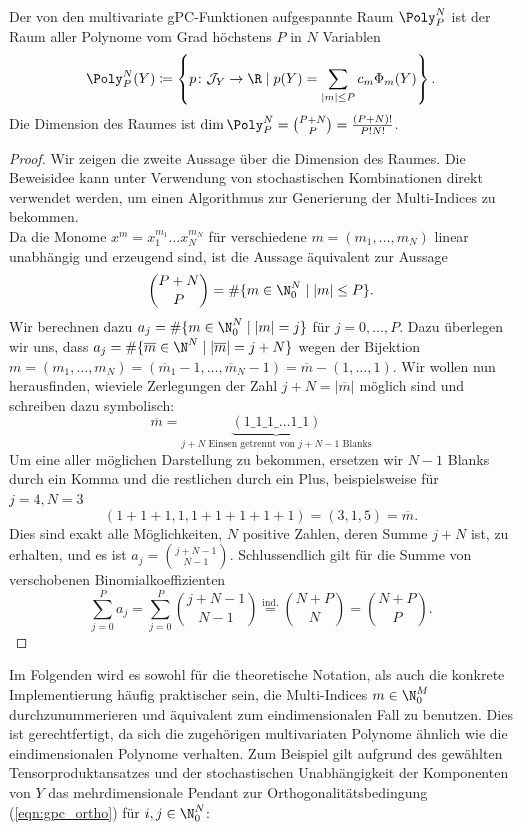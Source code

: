 \begin{mathbem}
Der von den multivariate gPC-Funktionen aufgespannte Raum $\Poly_P^N$ ist der Raum aller Polynome vom Grad höchstens $P$ in $N$ Variablen
\[\Poly_P^N(Y)\coloneqq \left\lbrace p\colon \mathcal{J}_Y\to \R \mid p(Y)=\sum_{|m|\le P}c_m\Phi_m(Y)\right\rbrace.\]
Die Dimension des Raumes ist $\dim\Poly_P^N=\binom{P+N}{P}=\frac{(P+N)!}{P!N!}$.
\end{mathbem}
\begin{proof}
Wir zeigen die zweite Aussage über die Dimension des Raumes. Die Beweisidee kann unter Verwendung von stochastischen Kombinationen direkt verwendet werden, um einen Algorithmus zur Generierung der Multi-Indices zu bekommen.\\
Da die Monome $x^m=x_1^{m_1}\dots x_N^{m_N}$ für verschiedene $m=(m_1,\dots,m_N)$ linear unabhängig und erzeugend sind, ist die Aussage äquivalent zur Aussage
\[\binom{P+N}{P}=\#\lbrace m\in\N_0^N \mid |m|\le P\rbrace.\] 
Wir berechnen dazu $a_j=\#\lbrace m\in\N_0^N \mid |m|=j\rbrace$ für $j=0,\dots,P$. Dazu überlegen wir uns, dass $a_j=\#\lbrace \overline{m}\in\N^N \mid |\overline{m}|=j+N\rbrace$ wegen der Bijektion $m=(m_1,\dots,m_N)=(\overline{m}_1-1,\dots,\overline{m}_N-1)=\overline{m}-(1,\dots,1)$. Wir wollen nun herausfinden, wieviele Zerlegungen der Zahl $j+N=|\overline{m}|$ möglich sind und schreiben dazu symbolisch:
\[\overline{m}=\underbrace{(1\_1\_1\_\dots 1\_1)}_{j+N\text{ Einsen getrennt von } j+N-1 \text{ Blanks}}\]
Um eine aller möglichen Darstellung zu bekommen, ersetzen wir $N-1$ Blanks durch ein Komma und die restlichen durch ein Plus, beispielsweise für $j=4,N=3$
\[(1+1+1,1,1+1+1+1+1)=(3,1,5)=\overline{m}.\]
Dies sind exakt alle Möglichkeiten, $N$ positive Zahlen, deren Summe $j+N$ ist, zu erhalten, und es ist $a_j=\binom{j+N-1}{N-1}$.
Schlussendlich gilt für die Summe von verschobenen Binomialkoeffizienten 
\[\sum_{j=0}^Pa_j=\sum_{j=0}^P\binom{j+N-1}{N-1}\stackrel{\text{ind.}}{=}\binom{N+P}{N}=\binom{N+P}{P}.\]
\end{proof}
Im Folgenden wird es sowohl für die theoretische Notation, als auch die konkrete Implementierung häufig praktischer sein, die Multi-Indices $m\in\N_0^M$ durchzunummerieren und äquivalent zum eindimensionalen Fall zu benutzen. Dies ist gerechtfertigt, da sich die zugehörigen multivariaten Polynome ähnlich wie die eindimensionalen Polynome verhalten. Zum Beispiel gilt aufgrund des gewählten Tensorproduktansatzes und der stochastischen Unabhängigkeit der Komponenten von $Y$ das mehrdimensionale Pendant zur Orthogonalitätsbedingung (\ref{eqn:gpc_ortho}) für $i,j\in\N_0^N$:
